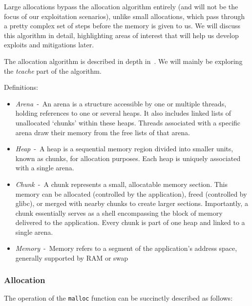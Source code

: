 \documentclass{article}
\begin{document}
Large allocations bypass the allocation algorithm entirely (and will not be the focus of our exploitation scenarios), unlike small allocations, which pass through a pretty complex set of steps before the memory is given to us. We will discuss this algorithm in detail, highlighting areas of interest that will help us develop exploits and mitigations later.

The allocation algorithm is described in depth in~\cite{MallocInternals}. We will mainly be exploring the \emph{tcache} part of the algorithm.

Definitions:
\begin{itemize}
  \item \emph{Arena}~-~An arena is a structure accessible by one or multiple threads, holding references to one or several heaps. It also includes linked lists of unallocated `chunks' within these heaps. Threads associated with a specific arena draw their memory from the free lists of that arena.
  \item \emph{Heap}~-~A heap is a sequential memory region divided into smaller units, known as chunks, for allocation purposes. Each heap is uniquely associated with a single arena.
  \item \emph{Chunk}~-~A chunk represents a small, allocatable memory section. This memory can be allocated (controlled by the application), freed (controlled by glibc), or merged with nearby chunks to create larger sections. Importantly, a chunk essentially serves as a shell encompassing the block of memory delivered to the application. Every chunk is part of one heap and linked to a single arena.
  \item \emph{Memory}~-~Memory refers to a segment of the application's address space, generally supported by RAM or swap
\end{itemize}

\subsubsection{Allocation}
The operation of the \texttt{malloc} function can be succinctly described as follows:
\end{document}

